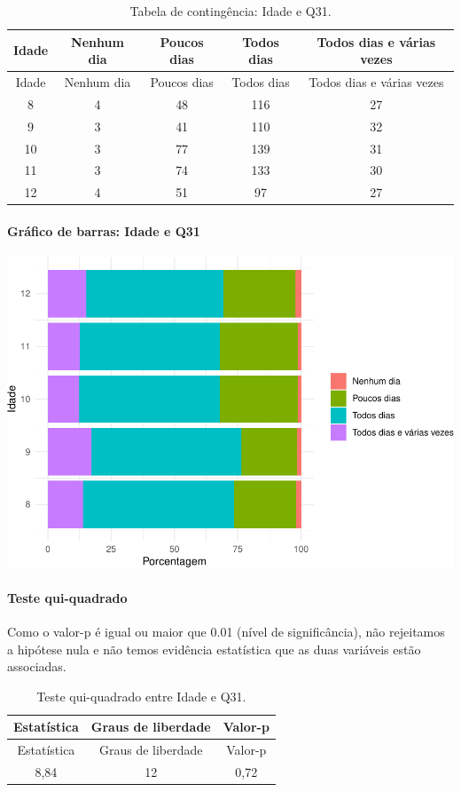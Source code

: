 \documentclass[]{article}
\let\oldparagraph\paragraph
\renewcommand{\paragraph}[1]{\oldparagraph{#1}\mbox{}}
\begin{document}
\begin{longtable}[]{@{}ccccc@{}}
\caption{\label{tab:unnamed-chunk-1036}Tabela de contingência: Idade e Q31.}\tabularnewline
\toprule
Idade & Nenhum dia & Poucos dias & Todos dias & Todos dias e várias vezes\tabularnewline
\midrule
\endfirsthead
\toprule
Idade & Nenhum dia & Poucos dias & Todos dias & Todos dias e várias vezes\tabularnewline
\midrule
\endhead
8 & 4 & 48 & 116 & 27\tabularnewline
9 & 3 & 41 & 110 & 32\tabularnewline
10 & 3 & 77 & 139 & 31\tabularnewline
11 & 3 & 74 & 133 & 30\tabularnewline
12 & 4 & 51 & 97 & 27\tabularnewline
\bottomrule
\end{longtable}

\hypertarget{gruxe1fico-de-barras-idade-e-q31}{%
\paragraph{Gráfico de barras: Idade e Q31}\label{gruxe1fico-de-barras-idade-e-q31}}

\begin{center}\includegraphics[width=0.75\linewidth]{relatorio_covid19_files/figure-latex/unnamed-chunk-1037-1} \end{center}

\hypertarget{teste-qui-quadrado-89}{%
\paragraph{Teste qui-quadrado}\label{teste-qui-quadrado-89}}

Como o valor-p é igual ou maior que 0.01 (nível de significância), não rejeitamos a hipótese nula e não temos evidência estatística que as duas variáveis estão associadas.

\begin{longtable}[]{@{}ccc@{}}
\caption{\label{tab:unnamed-chunk-1039}Teste qui-quadrado entre Idade e Q31.}\tabularnewline
\toprule
Estatística & Graus de liberdade & Valor-p\tabularnewline
\midrule
\endfirsthead
\toprule
Estatística & Graus de liberdade & Valor-p\tabularnewline
\midrule
\endhead
8,84 & 12 & 0,72\tabularnewline
\bottomrule
\end{longtable}
\end{document}

